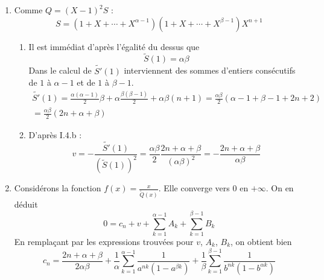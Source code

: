 \begin{enumerate}
\item Comme $Q=(X-1)^2S$ :
\begin{displaymath}
 S=(1+X+\cdots + X^{\alpha -1})(1+X+\cdots + X^{\beta -1})X^{n+1}
\end{displaymath}
\begin{enumerate}
 \item Il est immédiat d'après l'égalité du dessus que 
\begin{displaymath}
\widetilde{S}(1)=\alpha \beta 
\end{displaymath}
Dans le calcul de $\widetilde{S'}(1)$ interviennent des sommes d'entiers consécutifs de $1$ à $\alpha -1$ et de $1$ à $\beta -1$.
\begin{multline*}
\widetilde{S'}(1) = \frac{\alpha(\alpha -1)}{2}\beta +\alpha\frac{\beta (\beta -1)}{2}+\alpha\beta(n+1)
=\frac{\alpha \beta}{2}(\alpha -1 + \beta -1 +2n +2) \\
= \frac{\alpha \beta}{2}(2n+\alpha + \beta)
\end{multline*}

 \item D'après I.4.b :
\begin{displaymath}
 v=-\frac{\widetilde{S'}(1)}{\left( \widetilde{S}(1)\right) ^2}
= \frac{\alpha \beta}{2}\frac{2n +\alpha + \beta}{(\alpha \beta)^2}
= - \frac{2n+\alpha +\beta}{\alpha \beta}
\end{displaymath}
\end{enumerate}

\item Considérons la fonction $f(x)=\frac{x}{\widetilde{Q}(x)}$. Elle converge vers $0$ en $+\infty$. On en déduit
\begin{displaymath}
 0 = c_n +v +\sum_{k=1}^{\alpha -1}A_k +\sum_{k=1}^{\beta -1}B_k
\end{displaymath}
En remplaçant par les expressions trouvées pour $v$, $A_k$, $B_k$, on obtient bien
\begin{displaymath}
  c_n= \frac{2n+\alpha + \beta}{2\alpha \beta} + \frac{1}{\alpha}\sum_{k=1}^{\alpha -1}\frac{1}{a^{n k}(1-a^{\beta k})} 
 + \frac{1}{\beta}\sum_{k=1}^{\beta -1}\frac{1}{b^{n k}(1-b^{\alpha k})}
\end{displaymath}
\end{enumerate}

